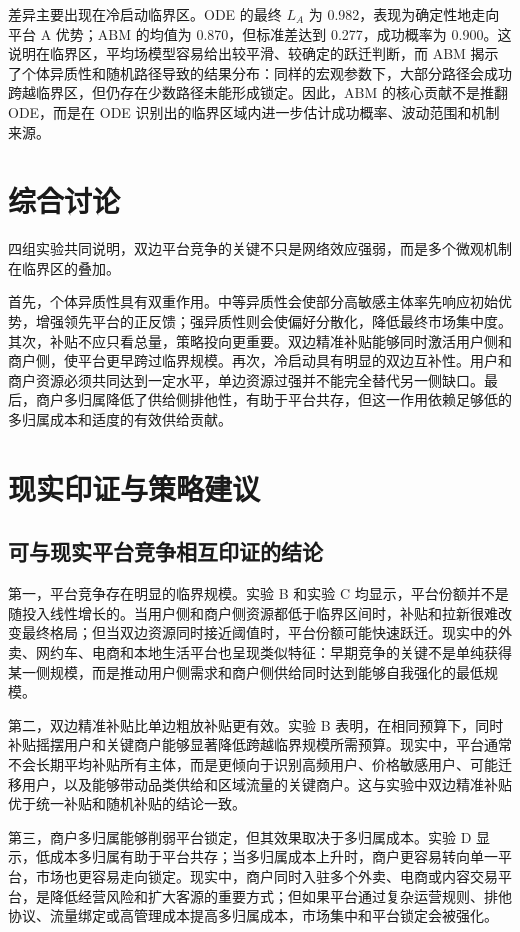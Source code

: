﻿\documentclass[UTF8,zihao=-4]{ctexart}
\begin{document}
差异主要出现在冷启动临界区。ODE 的最终 $L_A$ 为 0.982，表现为确定性地走向平台 A 优势；ABM 的均值为 0.870，但标准差达到 0.277，成功概率为 0.900。这说明在临界区，平均场模型容易给出较平滑、较确定的跃迁判断，而 ABM 揭示了个体异质性和随机路径导致的结果分布：同样的宏观参数下，大部分路径会成功跨越临界区，但仍存在少数路径未能形成锁定。因此，ABM 的核心贡献不是推翻 ODE，而是在 ODE 识别出的临界区域内进一步估计成功概率、波动范围和机制来源。

\section{综合讨论}

四组实验共同说明，双边平台竞争的关键不只是网络效应强弱，而是多个微观机制在临界区的叠加。

首先，个体异质性具有双重作用。中等异质性会使部分高敏感主体率先响应初始优势，增强领先平台的正反馈；强异质性则会使偏好分散化，降低最终市场集中度。其次，补贴不应只看总量，策略投向更重要。双边精准补贴能够同时激活用户侧和商户侧，使平台更早跨过临界规模。再次，冷启动具有明显的双边互补性。用户和商户资源必须共同达到一定水平，单边资源过强并不能完全替代另一侧缺口。最后，商户多归属降低了供给侧排他性，有助于平台共存，但这一作用依赖足够低的多归属成本和适度的有效供给贡献。

\section{现实印证与策略建议}

\subsection{可与现实平台竞争相互印证的结论}

第一，平台竞争存在明显的临界规模。实验 B 和实验 C 均显示，平台份额并不是随投入线性增长的。当用户侧和商户侧资源都低于临界区间时，补贴和拉新很难改变最终格局；但当双边资源同时接近阈值时，平台份额可能快速跃迁。现实中的外卖、网约车、电商和本地生活平台也呈现类似特征：早期竞争的关键不是单纯获得某一侧规模，而是推动用户侧需求和商户侧供给同时达到能够自我强化的最低规模。

第二，双边精准补贴比单边粗放补贴更有效。实验 B 表明，在相同预算下，同时补贴摇摆用户和关键商户能够显著降低跨越临界规模所需预算。现实中，平台通常不会长期平均补贴所有主体，而是更倾向于识别高频用户、价格敏感用户、可能迁移用户，以及能够带动品类供给和区域流量的关键商户。这与实验中双边精准补贴优于统一补贴和随机补贴的结论一致。

第三，商户多归属能够削弱平台锁定，但其效果取决于多归属成本。实验 D 显示，低成本多归属有助于平台共存；当多归属成本上升时，商户更容易转向单一平台，市场也更容易走向锁定。现实中，商户同时入驻多个外卖、电商或内容交易平台，是降低经营风险和扩大客源的重要方式；但如果平台通过复杂运营规则、排他协议、流量绑定或高管理成本提高多归属成本，市场集中和平台锁定会被强化。
\end{document}

